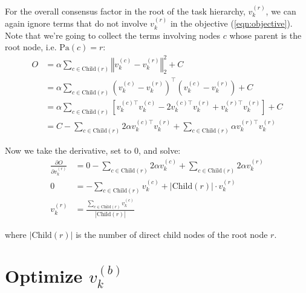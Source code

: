 \documentclass{article}
\begin{document}
For the overall consensus factor in the root of the task hierarchy, $v^{(r)}_{k}$, we can again ignore terms that do not involve $v^{(r)}_{k}$ in the objective (\ref{eqn:objective}). Note that we're going to collect the terms involving nodes $c$ whose parent is the root node, i.e. $\text{Pa}(c) = r$:
\begin{align}
O &= \alpha \sum_{c \in \text{Child}(r)} 
\left\Vert v^{(c)}_{k} - v^{(r)}_{k}\right\Vert_\text{2}^2 + C\\
&= \alpha  \sum_{c \in \text{Child}(r)}
\left(
v^{(c)}_{k} - v^{(r)}_{k}
\right)^\top 
\left(
v^{(c)}_{k} - v^{(r)}_{k}
\right)
+ C\\
&= \alpha
\sum_{c \in \text{Child}(r)} \left[ 
v^{(c)\top}_{k} v^{(c)}_{k} - 2 v^{(c)\top}_{k}v^{(r)}_{k} + v^{(r)\top}_{k} v^{(r)}_{k} \right] + C\\
&= 
C
- \sum_{c \in \text{Child}(r)} 2 \alpha  v^{(c)\top}_{k} v^{(r)}_{k} 
+ \sum_{c \in \text{Child}(r)} \alpha  v^{(r)\top}_{k} v^{(r)}_{k}
\end{align}

Now we take the derivative, set to $0$, and solve:
\begin{align}
\frac{\partial O}{\partial v^{(r)}_{k}} 
&=0 
- \sum_{c \in \text{Child}(r)} 2 \alpha  v^{(c)}_{k}  
+ \sum_{c \in \text{Child}(r)} 2  \alpha  v^{(r)}_{k}  \\
0 &=  - \sum_{c \in \text{Child}(r)} v^{(c)}_{k} 
 + | \text{Child}(r) | \cdot v^{(r)}_{k} \\
v^{(r)}_{k} & = \frac{\sum_{c \in \text{Child}(r)} v^{(c)}_{k}}{| \text{Child}(r) | }
\end{align}

where $| \text{Child}(r) | $ is the number of direct child nodes of the root node $r$.
\medskip

\section*{Optimize $v^{(b)}_{k}$}
\end{document}
